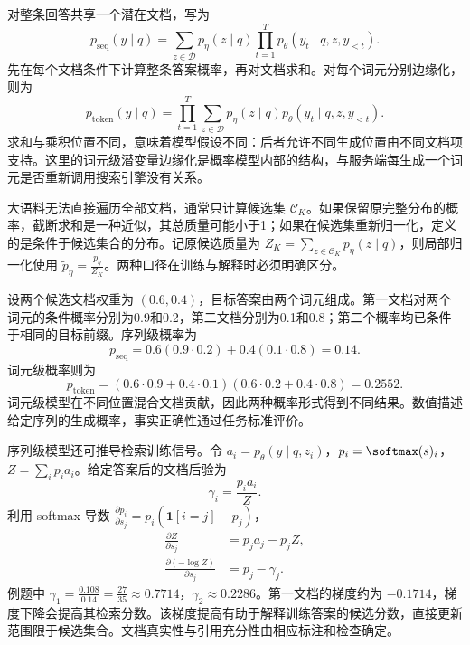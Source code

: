 \documentclass[../textbook.tex]{subfiles}
\begin{document}
对整条回答共享一个潜在文档，写为
\begin{equation}
 p_{\mathrm{seq}}(y\mid q)
 =\sum_{z\in\mathcal D}p_\eta(z\mid q)
   \prod_{t=1}^{T}p_\theta(y_t\mid q,z,y_{<t}).
 \label{eq:rag-sequence}
\end{equation}
先在每个文档条件下计算整条答案概率，再对文档求和。对每个词元分别边缘化，则为
\begin{equation}
 p_{\mathrm{token}}(y\mid q)
 =\prod_{t=1}^{T}\sum_{z\in\mathcal D}p_\eta(z\mid q)
  p_\theta(y_t\mid q,z,y_{<t}).
 \label{eq:rag-token}
\end{equation}
求和与乘积位置不同，意味着模型假设不同：后者允许不同生成位置由不同文档项支持。这里的词元级潜变量边缘化是概率模型内部的结构，与服务端每生成一个词元是否重新调用搜索引擎没有关系。

大语料无法直接遍历全部文档，通常只计算候选集 $\mathcal C_K$。如果保留原完整分布的概率，截断求和是一种近似，其总质量可能小于1；如果在候选集重新归一化，定义的是条件于候选集合的分布。记原候选质量为 $Z_K=\sum_{z\in\mathcal C_K}p_\eta(z\mid q)$，则局部归一化使用 $\widetilde p_\eta=\frac{p_\eta}{Z_K}$。两种口径在训练与解释时必须明确区分。

\begin{example}


设两个候选文档权重为 $(0.6,0.4)$，目标答案由两个词元组成。第一文档对两个词元的条件概率分别为0.9和0.2，第二文档分别为0.1和0.8；第二个概率均已条件于相同的目标前缀。序列级概率为
\begin{equation*}
 p_{\mathrm{seq}}=0.6(0.9\cdot0.2)+0.4(0.1\cdot0.8)=0.14.
\end{equation*}
词元级概率则为
\begin{equation*}
 p_{\mathrm{token}}=(0.6\cdot0.9+0.4\cdot0.1)
 (0.6\cdot0.2+0.4\cdot0.8)=0.2552.
\end{equation*}
词元级模型在不同位置混合文档贡献，因此两种概率形式得到不同结果。数值描述给定序列的生成概率，事实正确性通过任务标准评价。

序列级模型还可推导检索训练信号。令 $a_i=p_\theta(y\mid q,z_i)$，$p_i=\softmax(s)_i$，$Z=\sum_i p_i a_i$。给定答案后的文档后验为
\begin{equation*}
 \gamma_i=\frac{p_i a_i}{Z}.
\end{equation*}
利用 softmax 导数 $\frac{\partial p_i}{\partial s_j}=p_i(\mathbf1[i=j]-p_j)$，
\begin{align*}
 \frac{\partial Z}{\partial s_j}&=p_ja_j-p_jZ,\\
 \frac{\partial(-\log Z)}{\partial s_j}&=p_j-\gamma_j.
\end{align*}
例题中 $\gamma_1=\frac{0.108}{0.14}=\frac{27}{35}\approx0.7714$，$\gamma_2\approx0.2286$。第一文档的梯度约为 $-0.1714$，梯度下降会提高其检索分数。该梯度提高有助于解释训练答案的候选分数，直接更新范围限于候选集合。文档真实性与引用充分性由相应标注和检查确定。
\end{example}
\end{document}
